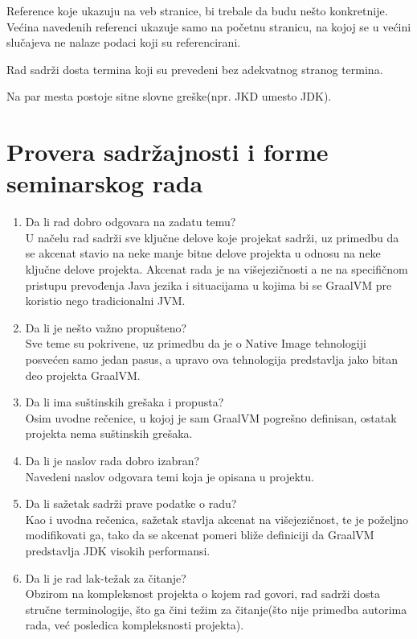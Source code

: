 \documentclass[a4paper]{report}
\begin{document}
\indent Reference koje ukazuju na veb stranice, bi trebale da budu nešto konkretnije. Većina navedenih referenci ukazuje samo na početnu stranicu, na kojoj se u većini slučajeva ne nalaze podaci koji su referencirani. 

\indent Rad sadrži dosta termina koji su prevedeni bez adekvatnog stranog termina.

\indent Na par mesta postoje sitne slovne greške(npr. JKD umesto JDK). 

\section{Provera sadržajnosti i forme seminarskog rada}

\begin{enumerate}
\item Da li rad dobro odgovara na zadatu temu?\\
U načelu rad sadrži sve ključne delove koje projekat sadrži, uz primedbu da se akcenat stavio na neke manje bitne delove projekta u odnosu na 
neke ključne delove projekta. Akcenat rada je na višejezičnosti a ne na specifičnom pristupu prevođenja Java jezika i situacijama u kojima bi 
se GraalVM pre koristio nego tradicionalni JVM. 

\item Da li je nešto važno propušteno?\\
Sve teme su pokrivene, uz primedbu da je o Native Image tehnologiji posvećen samo jedan pasus, a upravo ova tehnologija predstavlja jako bitan 
deo projekta GraalVM.

\item Da li ima suštinskih grešaka i propusta?\\
Osim uvodne rečenice, u kojoj je sam GraalVM pogrešno definisan, ostatak projekta nema suštinskih grešaka.

\item Da li je naslov rada dobro izabran?\\
Navedeni naslov odgovara temi koja je opisana u projektu.

\item Da li sažetak sadrži prave podatke o radu?\\
Kao i uvodna rečenica, sažetak stavlja akcenat na višejezičnost, te je poželjno modifikovati ga, tako da se akcenat pomeri bliže definiciji da 
GraalVM predstavlja JDK visokih performansi.

\item Da li je rad lak-težak za čitanje?\\
Obzirom na kompleksnost projekta o kojem rad govori, rad sadrži dosta stručne terminologije, što ga čini težim za čitanje(što nije primedba 
autorima rada, već posledica kompleksnosti projekta).


\end{enumerate}
\end{document}
